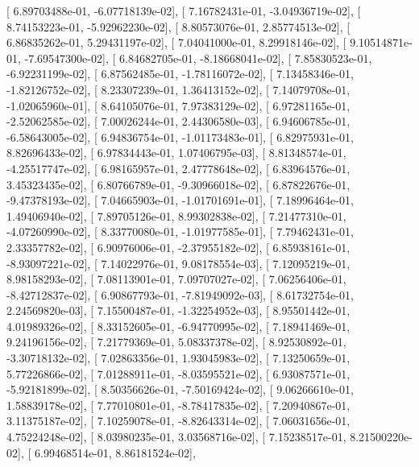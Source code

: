 \documentclass{article}
\begin{document}
       [  6.89703488e-01,  -6.07718139e-02],
       [  7.16782431e-01,  -3.04936719e-02],
       [  8.74153223e-01,  -5.92962230e-02],
       [  8.80573076e-01,   2.85774513e-02],
       [  6.86835262e-01,   5.29431197e-02],
       [  7.04041000e-01,   8.29918146e-02],
       [  9.10514871e-01,  -7.69547300e-02],
       [  6.84682705e-01,  -8.18668041e-02],
       [  7.85830523e-01,  -6.92231199e-02],
       [  6.87562485e-01,  -1.78116072e-02],
       [  7.13458346e-01,  -1.82126752e-02],
       [  8.23307239e-01,   1.36413152e-02],
       [  7.14079708e-01,  -1.02065960e-01],
       [  8.64105076e-01,   7.97383129e-02],
       [  6.97281165e-01,  -2.52062585e-02],
       [  7.00026244e-01,   2.44306580e-03],
       [  6.94606785e-01,  -6.58643005e-02],
       [  6.94836754e-01,  -1.01173483e-01],
       [  6.82975931e-01,   8.82696433e-02],
       [  6.97834443e-01,   1.07406795e-03],
       [  8.81348574e-01,  -4.25517747e-02],
       [  6.98165957e-01,   2.47778648e-02],
       [  6.83964576e-01,   3.45323435e-02],
       [  6.80766789e-01,  -9.30966018e-02],
       [  6.87822676e-01,  -9.47378193e-02],
       [  7.04665903e-01,  -1.01701691e-01],
       [  7.18996464e-01,   1.49406940e-02],
       [  7.89705126e-01,   8.99302838e-02],
       [  7.21477310e-01,  -4.07260990e-02],
       [  8.33770080e-01,  -1.01977585e-01],
       [  7.79462431e-01,   2.33357782e-02],
       [  6.90976006e-01,  -2.37955182e-02],
       [  6.85938161e-01,  -8.93097221e-02],
       [  7.14022976e-01,   9.08178554e-03],
       [  7.12095219e-01,   8.98158293e-02],
       [  7.08113901e-01,   7.09707027e-02],
       [  7.06256406e-01,  -8.42712837e-02],
       [  6.90867793e-01,  -7.81949092e-03],
       [  8.61732754e-01,   2.24569820e-03],
       [  7.15500487e-01,  -1.32254952e-03],
       [  8.95501442e-01,   4.01989326e-02],
       [  8.33152605e-01,  -6.94770995e-02],
       [  7.18941469e-01,   9.24196156e-02],
       [  7.21779369e-01,   5.08337378e-02],
       [  8.92530892e-01,  -3.30718132e-02],
       [  7.02863356e-01,   1.93045983e-02],
       [  7.13250659e-01,   5.77226866e-02],
       [  7.01288911e-01,  -8.03595521e-02],
       [  6.93087571e-01,  -5.92181899e-02],
       [  8.50356626e-01,  -7.50169424e-02],
       [  9.06266610e-01,   1.58839178e-02],
       [  7.77010801e-01,  -8.78417835e-02],
       [  7.20940867e-01,   3.11375187e-02],
       [  7.10259078e-01,  -8.82643314e-02],
       [  7.06031656e-01,   4.75224248e-02],
       [  8.03980235e-01,   3.03568716e-02],
       [  7.15238517e-01,   8.21500220e-02],
       [  6.99468514e-01,   8.86181524e-02],
\end{document}
